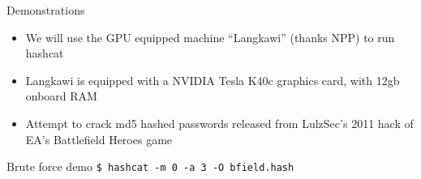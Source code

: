 \documentclass[12pt,aspectratio=169]{beamer}
\renewcommand{\emph}[1]{{\color{mLightBrown}#1}}
\begin{document}
\begin{frame}{Demonstrations}
  \begin{itemize}
    \item We will use the GPU equipped machine ``Langkawi'' (thanks NPP) to run hashcat
    \item Langkawi is equipped with a NVIDIA Tesla K40c graphics card, with 12gb onboard RAM
    \item Attempt to crack \emph{md5 hashed} passwords released from LulzSec's 2011 hack of EA's Battlefield Heroes game
  \end{itemize}
\end{frame}

\begin{frame}{Brute force demo}
  \lstinline|$ hashcat -m 0 -a 3 -O bfield.hash|
\end{frame}
\end{document}
